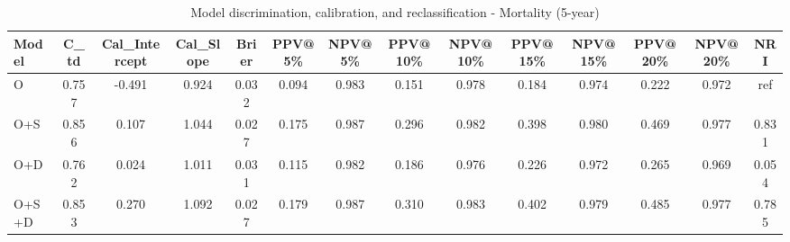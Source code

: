 \begin{table}[htbp]
\centering
\small
\caption{Model discrimination, calibration, and reclassification - Mortality (5-year)}
\label{tab:perf_mortality_5y}
\begin{tabular}{lccccccccccccc}
\toprule
Model & C\_td & Cal\_Intercept & Cal\_Slope & Brier & PPV@5\% & NPV@5\% & PPV@10\% & NPV@10\% & PPV@15\% & NPV@15\% & PPV@20\% & NPV@20\% & NRI \\
\midrule
O & 0.757 & -0.491 & 0.924 & 0.032 & 0.094 & 0.983 & 0.151 & 0.978 & 0.184 & 0.974 & 0.222 & 0.972 & ref \\
O+S & 0.856 & 0.107 & 1.044 & 0.027 & 0.175 & 0.987 & 0.296 & 0.982 & 0.398 & 0.980 & 0.469 & 0.977 & 0.831 \\
O+D & 0.762 & 0.024 & 1.011 & 0.031 & 0.115 & 0.982 & 0.186 & 0.976 & 0.226 & 0.972 & 0.265 & 0.969 & 0.054 \\
O+S+D & 0.853 & 0.270 & 1.092 & 0.027 & 0.179 & 0.987 & 0.310 & 0.983 & 0.402 & 0.979 & 0.485 & 0.977 & 0.785 \\
\bottomrule
\end{tabular}
\end{table}